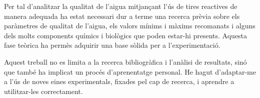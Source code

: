 

Per tal d'analitzar la qualitat de l’aigua mitjançant l’ús de tires reactives  de manera adequada ha estat necessari dur a terme una recerca prèvia sobre els paràmetres de qualitat de l’aigua, els valors mínims i màxims recomanats i alguns dels molts components químics i biològics que poden estar-hi presents. Aquesta fase teòrica ha permès adquirir una base sòlida per a l'experimentació.

Aquest treball no es limita a la recerca bibliogràfica i l’anàlisi de resultats, sinó que també ha implicat un procés d’aprenentatge personal. He hagut d’adaptar-me a l’ús de noves eines experimentals, fixades pel cap de recerca, i aprendre a utilitzar-les correctament.

%

